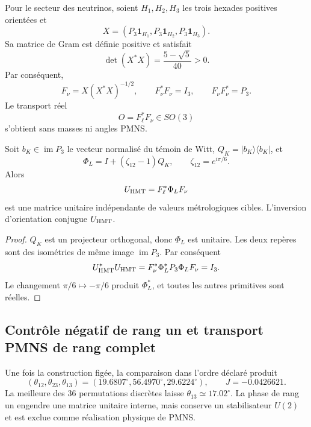 Pour le secteur des neutrinos, soient \(H_1,H_2,H_3\) les trois hexades positives orientées et
\[
 X=(P_3\mathbf1_{H_1},P_3\mathbf1_{H_2},P_3\mathbf1_{H_3}).
\]
Sa matrice de Gram est définie positive et satisfait
\[
 \det(X^*X)=\frac{5-\sqrt5}{40}>0.
\]
Par conséquent,
\[
 F_\nu=X(X^*X)^{-1/2},
 \qquad F_\nu^*F_\nu=I_3,
 \qquad F_\nu F_\nu^*=P_3.
\]
Le transport réel
\begin{equation}
 O=F_\ell^*F_\nu\in SO(3)
 \label{eq:transporte-frames-pmns-rev11}
\end{equation}
s'obtient sans masses ni angles PMNS.

\begin{theorem}
\label{thm:unitaria-interna-pmns-rev11} Soit \(b_K\in\operatorname{im}P_3\) le vecteur normalisé du témoin de Witt, \(Q_K=|b_K\rangle\langle b_K|\), et
\[
 \Phi_L=I+(\zeta_{12}-1)Q_K,
 \qquad \zeta_{12}=e^{i\pi/6}.
\]
Alors
\begin{equation}
 U_{\rm HMT}=F_\ell^*\Phi_LF_\nu
 \label{eq:unitaria-interna-pmns-rev11}
\end{equation}
est une matrice unitaire indépendante de valeurs métrologiques cibles. L'inversion d'orientation conjugue \(U_{\rm HMT}\).
\end{theorem}

\begin{proof}
\(Q_K\) est un projecteur orthogonal, donc \(\Phi_L\) est unitaire. Les deux repères sont des isométries de même image \(\operatorname{im}P_3\). Par conséquent
\[
 U_{\rm HMT}^*U_{\rm HMT}
 =F_\nu^*\Phi_L^*P_3\Phi_LF_\nu=I_3.
\]
Le changement \(\pi/6\mapsto-\pi/6\) produit \(\Phi_L^*\), et toutes les autres primitives sont réelles.
\end{proof}

\subsection{Contrôle négatif de rang un et transport PMNS de rang complet}
\label{sec:no-go-pmns-rango-uno-rev11} 

Une fois la construction figée, la comparaison dans l'ordre déclaré produit
\[
 (\theta_{12},\theta_{23},\theta_{13})
 =(19.6807^\circ,56.4970^\circ,29.6224^\circ),
 \qquad J=-0.0426621.
\]
La meilleure des 36 permutations discrètes laisse \(\theta_{13}\simeq17.02^\circ\). La phase de rang un engendre une matrice unitaire interne, mais conserve un stabilisateur \(U(2)\) et est exclue comme réalisation physique de PMNS.

